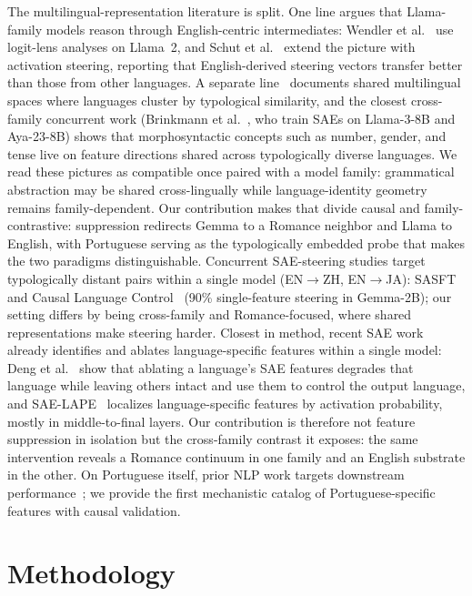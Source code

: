 \documentclass[runningheads]{llncs}
\begin{document}
The multilingual-representation literature is split. One line argues that Llama-family models reason through English-centric intermediates: Wendler et al.~\cite{wendler2024llamas} use logit-lens analyses on Llama~2, and Schut et al.~\cite{schut2025english} extend the picture with activation steering, reporting that English-derived steering vectors transfer better than those from other languages. A separate line~\cite{kojima2024multilingual} documents shared multilingual spaces where languages cluster by typological similarity, and the closest cross-family concurrent work (Brinkmann et al.~\cite{brinkmann2025shared}, who train SAEs on Llama-3-8B and Aya-23-8B) shows that morphosyntactic concepts such as number, gender, and tense live on feature directions shared across typologically diverse languages. We read these pictures as compatible once paired with a model family: grammatical abstraction may be shared cross-lingually while language-identity geometry remains family-dependent. Our contribution makes that divide causal and family-contrastive: suppression redirects Gemma to a Romance neighbor and Llama to English, with Portuguese serving as the typologically embedded probe that makes the two paradigms distinguishable. Concurrent SAE-steering studies target typologically distant pairs within a single model (EN$\to$ZH, EN$\to$JA): SASFT~\cite{sasft2026} and Causal Language Control~\cite{causal_lang_control2025} (90\% single-feature steering in Gemma-2B); our setting differs by being cross-family and Romance-focused, where shared representations make steering harder. Closest in method, recent SAE work already identifies and ablates language-specific features within a single model: Deng et al.~\cite{deng2025unveiling} show that ablating a language's SAE features degrades that language while leaving others intact and use them to control the output language, and SAE-LAPE~\cite{andrylie2025saelape} localizes language-specific features by activation probability, mostly in middle-to-final layers. Our contribution is therefore not feature suppression in isolation but the cross-family contrast it exposes: the same intervention reveals a Romance continuum in one family and an English substrate in the other. On Portuguese itself, prior NLP work targets downstream performance~\cite{souza2020bertimbau}; we provide the first mechanistic catalog of Portuguese-specific features with causal validation.

\section{Methodology}
\label{sec:method}
\end{document}
